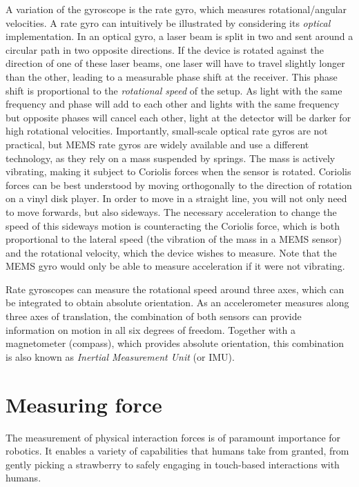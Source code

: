 A variation of the gyroscope is the rate gyro, which measures rotational/angular velocities. A rate gyro  can intuitively be illustrated by considering its \textsl{optical} implementation.
In an optical gyro, a laser beam is split in two and sent around a circular path in two opposite directions. If the device is rotated against the direction of one of these laser beams, one laser will have to travel slightly longer than the other, leading to a measurable phase shift at the receiver.
This phase shift is proportional to the \textsl{rotational speed} of the setup. As light with the same frequency and phase will add to each other and lights with the same frequency but opposite phases will cancel each other, light at the detector will be darker for high rotational velocities.
Importantly, small-scale optical rate gyros are not practical, but MEMS rate gyros are widely available and use a different technology, as they rely on a mass suspended by springs. The mass is actively vibrating, making it subject to Coriolis forces when the sensor is rotated. Coriolis forces can be best understood by moving orthogonally to the direction of rotation on a vinyl disk player. In order to move in a straight line, you will not only need to move forwards, but also sideways. The necessary acceleration to change the speed of this sideways motion is counteracting the Coriolis force, which is both proportional to the lateral speed (the vibration of the mass in a MEMS sensor) and the rotational velocity, which the device wishes to measure. Note that the MEMS gyro would only be able to measure acceleration if it were not vibrating.

Rate gyroscopes can measure the rotational speed around three axes, which can be integrated to obtain absolute orientation. As an accelerometer measures along three axes of translation, the combination of both sensors can provide information on motion in all six degrees of freedom. Together with a magnetometer (compass), which provides absolute orientation, this combination is also known as \textsl{Inertial Measurement Unit} (or IMU).

\section{Measuring force}
The measurement of physical interaction forces is of paramount importance for robotics.
It enables a variety of capabilities that humans take from granted, from gently picking a strawberry to safely engaging in touch-based interactions with humans.

